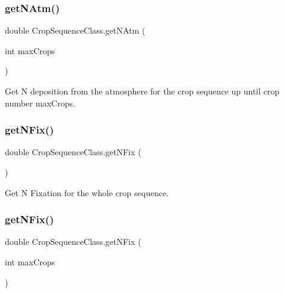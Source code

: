\mbox{\label{class_crop_sequence_class_ae6da92b63f5527310b369acc051f001a}} 
\subsubsection{\texorpdfstring{getNAtm()}{getNAtm()}\hspace{0.1cm}{\footnotesize\ttfamily [2/2]}}
{\footnotesize\ttfamily double Crop\+Sequence\+Class.\+get\+N\+Atm (\begin{DoxyParamCaption}\item[{int}]{max\+Crops }\end{DoxyParamCaption})\hspace{0.3cm}{\ttfamily [inline]}}



Get N deposition from the atmosphere for the crop sequence up until crop number max\+Crops. 

\mbox{\label{class_crop_sequence_class_a6a457da282f25f876f72361627966d8b}} 
\subsubsection{\texorpdfstring{getNFix()}{getNFix()}\hspace{0.1cm}{\footnotesize\ttfamily [1/2]}}
{\footnotesize\ttfamily double Crop\+Sequence\+Class.\+get\+N\+Fix (\begin{DoxyParamCaption}{ }\end{DoxyParamCaption})\hspace{0.3cm}{\ttfamily [inline]}}



Get N Fixation for the whole crop sequence. 

\mbox{\label{class_crop_sequence_class_af712de3da9cee75cd72099d132d9ce4f}} 
\subsubsection{\texorpdfstring{getNFix()}{getNFix()}\hspace{0.1cm}{\footnotesize\ttfamily [2/2]}}
{\footnotesize\ttfamily double Crop\+Sequence\+Class.\+get\+N\+Fix (\begin{DoxyParamCaption}\item[{int}]{max\+Crops }\end{DoxyParamCaption})\hspace{0.3cm}{\ttfamily [inline]}}



